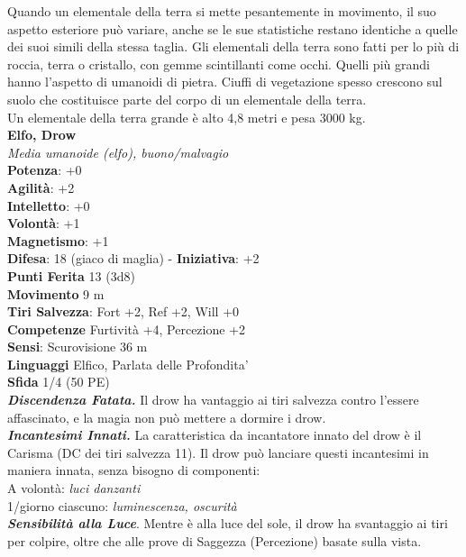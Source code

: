 \begin{multicols}{2}
Quando un elementale della terra si mette pesantemente in movimento, il suo aspetto esteriore può variare, anche se le sue statistiche restano identiche a quelle dei suoi simili della stessa taglia. Gli elementali della terra sono fatti per lo più di roccia, terra o cristallo, con gemme scintillanti come occhi. Quelli più grandi hanno l’aspetto di umanoidi di pietra. Ciuffi di vegetazione spesso crescono sul suolo che costituisce parte del corpo di un elementale della terra.\\

Un elementale della terra grande è alto 4,8 metri e pesa 3000 kg.\\

\medskip\textbf{Elfo, Drow}\\
\emph{Media umanoide (elfo), buono/malvagio}\\
\textbf{Potenza}: +0\\
\textbf{Agilità}: +2\\
\textbf{Intelletto}: +0\\
\textbf{Volontà}: +1\\
\textbf{Magnetismo}: +1\\
\textbf{Difesa}: 18 (giaco di maglia) - \textbf{Iniziativa}: +2\\
\textbf{Punti Ferita} 13 (3d8)\\
\textbf{Movimento} 9 m\\
\textbf{Tiri Salvezza}: Fort +2, Ref +2, Will +0\\
\textbf{Competenze} Furtività +4, Percezione +2\\
\textbf{Sensi}: Scurovisione 36 m\\
\textbf{Linguaggi} Elfico, Parlata delle Profondita'\\
\textbf{Sfida} 1/4 (50 PE)\smallskip\\
\emph{\textbf{Discendenza Fatata.}} Il drow ha vantaggio ai tiri salvezza contro l'essere affascinato, e la magia non può mettere a dormire i drow.\\
\emph{\textbf{Incantesimi Innati.}} La caratteristica da incantatore innato del drow è il Carisma (DC dei tiri salvezza 11). Il drow può lanciare questi incantesimi in maniera innata, senza bisogno di componenti:\\
A volontà: \emph{luci danzanti}\\
1/giorno ciascuno: \emph{luminescenza, oscurità}\\
\emph{\textbf{Sensibilità alla Luce}}. Mentre è alla luce del sole, il drow ha svantaggio ai tiri per colpire, oltre che alle prove di Saggezza (Percezione) basate sulla vista.\\

\end{multicols}

